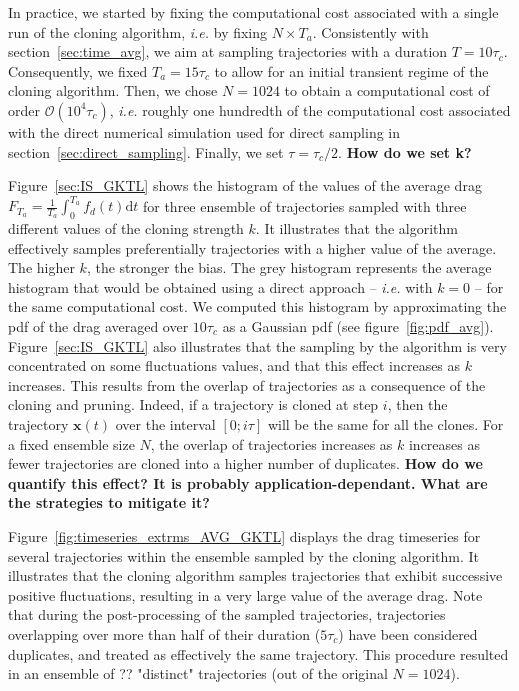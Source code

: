 \documentclass{jfm}
\begin{document}
In practice, we started by fixing the computational cost associated with a single run of the cloning algorithm, \textit{i.e.} by fixing $N \times T_a$.
Consistently with section~\ref{sec:time_avg}, we aim at sampling trajectories with a duration $T = 10\tau_c$.
Consequently, we fixed $T_a = 15\tau_c$ to allow for an initial transient regime of the cloning algorithm.
Then, we chose $N = 1024$ to obtain a computational cost of order $\mathcal{O}(10^4 \tau_c)$, \textit{i.e.} roughly one hundredth of the computational cost associated with the direct numerical simulation used for direct sampling in section~\ref{sec:direct_sampling}.
Finally, we set $\tau = \tau_c / 2$.
\textbf{How do we set k?}

Figure~\ref{sec:IS_GKTL} shows the histogram of the values of the average drag $F_{T_a} = \frac{1}{T_a}\int_{0}^{T_a}f_d(t)\mathrm{d}t$ for three ensemble of trajectories sampled with three different values of the cloning strength $k$.
It illustrates that the algorithm effectively samples preferentially trajectories with a higher value of the average.
The higher $k$, the stronger the bias.
The grey histogram represents the average histogram that would be obtained using a direct approach -- \textit{i.e.} with $k=0$ -- for the same computational cost.
We computed this histogram by approximating the \ac{pdf} of the drag averaged over $10\tau_c$ as a Gaussian \ac{pdf} (see figure~\ref{fig:pdf_avg}).
Figure~\ref{sec:IS_GKTL} also illustrates that the sampling by the algorithm is very concentrated on some fluctuations values, and that this effect increases as $k$ increases.
This results from the overlap of trajectories as a consequence of the cloning and pruning.
Indeed, if a trajectory is cloned at step $i$, then the trajectory ${\mathbf{x}(t)}$ over the interval $[0;i\tau]$ will be the same for all the clones.
For a fixed ensemble size $N$, the overlap of trajectories increases as $k$ increases as fewer
trajectories are cloned into a higher number of duplicates.
\textbf{How do we quantify this effect? It is probably application-dependant. What are the strategies to mitigate it?}

Figure~\ref{fig:timeseries_extrms_AVG_GKTL} displays the drag timeseries for several trajectories within the ensemble sampled by the cloning algorithm.
It illustrates that the cloning algorithm samples trajectories that exhibit successive positive fluctuations, resulting in a very large value of the average drag.
Note that during the post-processing of the sampled trajectories, trajectories overlapping over more than half of their duration ($5 \tau_c$) have been considered duplicates, and treated as effectively the same trajectory.
This procedure resulted in an ensemble of ?? "distinct" trajectories (out of the original $N = 1024$).
\end{document}
